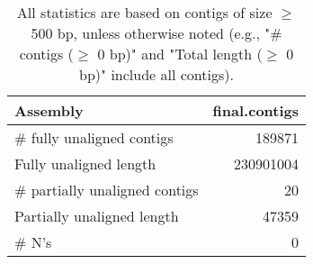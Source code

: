 \documentclass[12pt,a4paper]{article}
\begin{document}
\begin{table}[ht]
\begin{center}
\caption{All statistics are based on contigs of size $\geq$ 500 bp, unless otherwise noted (e.g., "\# contigs ($\geq$ 0 bp)" and "Total length ($\geq$ 0 bp)" include all contigs).}
\begin{tabular}{|l*{1}{|r}|}
\hline
Assembly & final.contigs \\ \hline
\# fully unaligned contigs & 189871 \\ \hline
Fully unaligned length & 230901004 \\ \hline
\# partially unaligned contigs & 20 \\ \hline
Partially unaligned length & 47359 \\ \hline
\# N's & 0 \\ \hline
\end{tabular}
\end{center}
\end{table}
\end{document}
